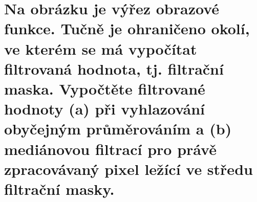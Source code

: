 \section{Na obrázku je výřez obrazové funkce. Tučně je ohraničeno okolí, ve kterém se má vypočítat filtrovaná hodnota, 
tj. filtrační maska. Vypočtěte filtrované hodnoty (a) při vyhlazování obyčejným průměrováním a (b) mediánovou filtrací 
pro právě zpracovávaný pixel ležící ve středu filtrační masky.}